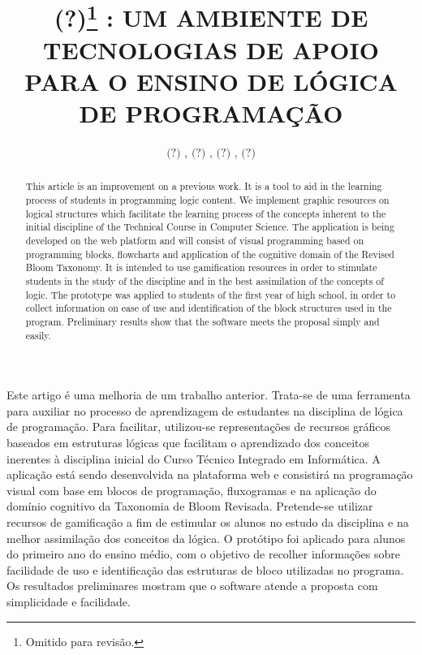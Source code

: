 \documentclass[12pt]{article}
\title{(?)\footnote{Omitido para revisão.} : UM AMBIENTE DE TECNOLOGIAS DE APOIO PARA O ENSINO DE LÓGICA DE PROGRAMAÇÃO}
\author{$\textbf{(?)}$ \inst{1}, $\textbf{(?)}$ \inst{1}, $\textbf{(?)}$ \inst{1}, $\textbf{(?)}$ \inst{1}}
\begin{document}
 

\maketitle

\begin{abstract}
This article is an improvement on a previous work. It is a tool to aid in the learning process of students in programming logic content. We implement graphic resources on logical structures which facilitate the learning process of the concepts inherent to the initial discipline of the Technical Course in Computer Science. The application is being developed on the web platform and will consist of visual programming based on programming blocks, flowcharts and application of the cognitive domain of the Revised Bloom Taxonomy. It is intended to use gamification resources in order to stimulate students in the study of the discipline and in the best assimilation of the concepts of logic. The prototype was applied to students of the first year of high school, in order to collect information on ease of use and identification of the block structures used in the program. Preliminary results show that the software meets the proposal simply and easily.
\end{abstract}
     
\begin{resumo}
Este artigo é uma melhoria de um trabalho anterior. Trata-se de uma ferramenta para auxiliar no processo de aprendizagem de estudantes na disciplina de lógica de programação. Para facilitar, utilizou-se representações de recursos gráficos baseados em estruturas lógicas que facilitam o aprendizado dos conceitos inerentes à disciplina inicial do Curso Técnico Integrado em Informática. A aplicação está sendo desenvolvida na plataforma web e consistirá na programação visual com base em blocos de programação, fluxogramas e na aplicação do domínio cognitivo da Taxonomia de Bloom Revisada. Pretende-se utilizar recursos de gamificação a fim de estimular os alunos no estudo da disciplina e na melhor assimilação dos conceitos da lógica. O protótipo foi aplicado para alunos do primeiro ano do ensino médio, com o objetivo de recolher informações sobre facilidade de uso e identificação das estruturas de bloco utilizadas no programa. Os resultados preliminares mostram que o software atende a proposta com simplicidade e facilidade.
\end{resumo}
\end{document}
